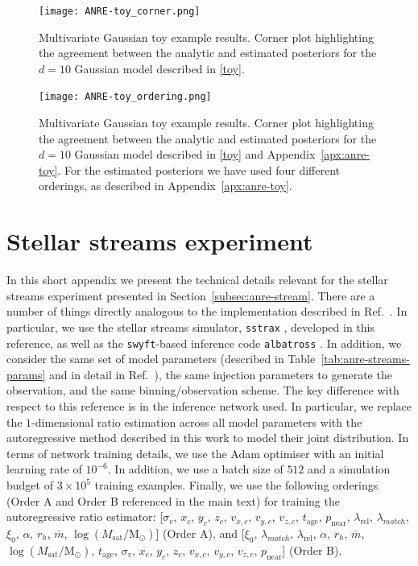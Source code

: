 \begin{subappendices}
\begin{figure}
\centering
\texttt{[image: ANRE-toy\_corner.png]}
\caption{
 Multivariate Gaussian toy example results. Corner plot highlighting the agreement between the analytic and estimated posteriors for the $d = 10$ Gaussian model described in \autoref{toy}.}
\label{fig:toy_corner}
\end{figure}

\begin{figure}
\centering
\texttt{[image: ANRE-toy\_ordering.png]}
\caption{
 Multivariate Gaussian toy example results. Corner plot highlighting the agreement between the analytic and estimated posteriors for the $d = 10$ Gaussian model described in \autoref{toy} and Appendix~\ref{apx:anre-toy}. For the estimated posteriors we have used four different orderings, as described in Appendix~\ref{apx:anre-toy}.}
\label{fig:toy_ordering}
\end{figure}

\section{Stellar streams experiment}
\label{apx:anre-streams}

 In this short appendix we present the technical details relevant for the stellar streams experiment presented in Section~\ref{subsec:anre-stream}. There are a number of things directly analogous to the implementation described in Ref.~\cite{Alvey:2023pkx}. In particular, we use the stellar streams simulator, \texttt{sstrax} \cite{sstrax}, developed in this reference, as well as the \texttt{swyft}-based inference code \texttt{albatross} \cite{albatross}. In addition, we consider the same set of model parameters (described in Table~\ref{tab:anre-streams-params} and in detail in Ref.~\cite{Alvey:2023pkx}), the same injection parameters to generate the observation, and the same binning/observation scheme. The key difference with respect to this reference is in the inference network used. In particular, we replace the $1$-dimensional ratio estimation across all model parameters with the autoregressive method described in this work to model their joint distribution. In terms of network training details, we use the Adam optimiser with an initial learning rate of $10^{-6}$. In addition, we use a batch size of $512$ and a simulation budget of $3\times 10^5$ training examples. Finally, we use the following orderings (Order A and Order B referenced in the main text) for training the autoregressive ratio estimator: [$\sigma_v$, $x_c$, $y_c$, $z_c$, $v_{x,c}$, $v_{y, c}$, $v_{z, c}$, $t_\mathrm{age}$, $p_\mathrm{near}$, $\lambda_\mathrm{rel}$, $\lambda_{match}$, $\xi_0$, $\alpha$, $r_h$, $\bar{m}$, $\log(M_\mathrm{sat}/\mathrm{M}_\odot)$] (Order A), and [$\xi_0$, $\lambda_{match}$, $\lambda_\mathrm{rel}$, $\alpha$, $r_h$, $\bar{m}$, $\log(M_\mathrm{sat}/\mathrm{M}_\odot)$, $t_\mathrm{age}$, $\sigma_v$, $x_c$, $y_c$, $z_c$, $v_{x,c}$, $v_{y, c}$, $v_{z, c}$, $p_\mathrm{near}$] (Order B).


\end{subappendices}

